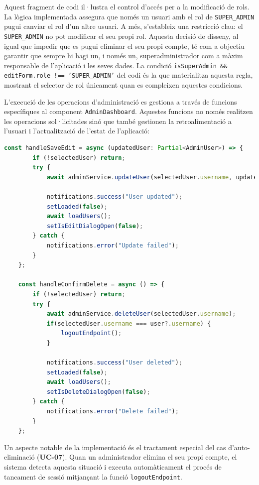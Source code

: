 Aquest fragment de codi il·lustra el control d'accés per a la modificació de rols. La lògica implementada assegura que només un usuari amb el rol de \texttt{SUPER\_ADMIN} pugui canviar el rol d'un altre usuari. A més, s'estableix una restricció clau: el \texttt{SUPER\_ADMIN} no pot modificar el seu propi rol. Aquesta decisió de disseny, al igual que impedir que es pugui eliminar el seu propi compte, té com a objectiu garantir que sempre hi hagi un, i només un, superadministrador com a màxim responsable de l'aplicació i les seves dades. La condició \texttt{isSuperAdmin \&\& editForm.role !== 'SUPER\_ADMIN'} del codi és la que materialitza aquesta regla, mostrant el selector de rol únicament quan es compleixen aquestes condicions.

L'execució de les operacions d'administració es gestiona a través de funcions específiques al component \texttt{AdminDashboard}. Aquestes funcions no només realitzen les operacions sol·licitades sinó que també gestionen la retroalimentació a l'usuari i l'actualització de l'estat de l'aplicació:

\begin{lstlisting}[language=typescript, caption={Gestió d'operacions administratives}]
    const handleSaveEdit = async (updatedUser: Partial<AdminUser>) => {
        if (!selectedUser) return;
        try {
            await adminService.updateUser(selectedUser.username, updatedUser);
            
            notifications.success("User updated");
            setLoaded(false);
            await loadUsers();
            setIsEditDialogOpen(false);
        } catch {
            notifications.error("Update failed");
        }
    };

    const handleConfirmDelete = async () => {
        if (!selectedUser) return;
        try {
            await adminService.deleteUser(selectedUser.username);
            if(selectedUser.username === user?.username) {
                logoutEndpoint();
            }
            
            notifications.success("User deleted");
            setLoaded(false);
            await loadUsers(); 
            setIsDeleteDialogOpen(false);
        } catch {
            notifications.error("Delete failed");
        }
    };
\end{lstlisting}

Un aspecte notable de la implementació és el tractament especial del cas d'auto-eliminació (\textbf{UC-07}). Quan un administrador elimina el seu propi compte, el sistema detecta aquesta situació i executa automàticament el procés de tancament de sessió mitjançant la funció \texttt{logoutEndpoint}.

